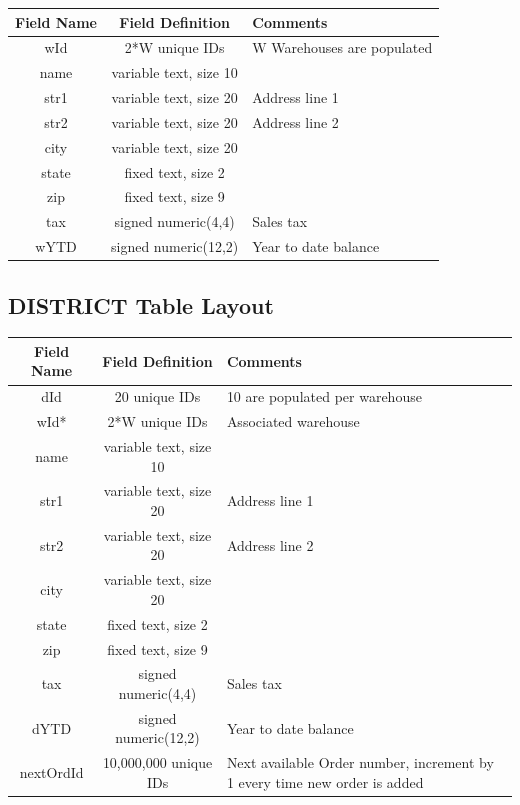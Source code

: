 \begin{center}
\begin{tabular}{ |c|c|m{7.5cm}| } 
 \hline
 Field Name & Field Definition & Comments \\ 
 \hline
 \rowcolor{gray}
 wId & 2*W unique IDs & W Warehouses are populated \\ 
 name & variable text, size 10 &  \\ 
 str1 & variable text, size 20 & Address line 1 \\
 str2 & variable text, size 20 & Address line 2 \\
 city & variable text, size 20 &  \\
 state & fixed text, size 2 & \\
 zip & fixed text, size 9 &  \\
 tax & signed numeric(4,4) & Sales tax \\
 wYTD & signed numeric(12,2) & Year to date balance \\

 \hline
\end{tabular}
\end{center}

\subsection{DISTRICT Table Layout}

\begin{center}
\begin{tabular}{ |c|c|m{7.5cm}| } 
 \hline
 Field Name & Field Definition & Comments \\ 
 \hline
 \rowcolor{gray}
 dId & 20 unique IDs & 10 are populated per warehouse\\
\rowcolor{gray}
 wId* & 2*W unique IDs & Associated warehouse \\ 
 name & variable text, size 10 &  \\ 
 str1 & variable text, size 20 & Address line 1 \\
 str2 & variable text, size 20 & Address line 2 \\
 city & variable text, size 20 &  \\
 state & fixed text, size 2 & \\
 zip & fixed text, size 9 &  \\
 tax & signed numeric(4,4) & Sales tax \\
 dYTD & signed numeric(12,2) & Year to date balance \\
 nextOrdId & 10,000,000 unique IDs & Next available Order number, increment by 1 every time new order is added \\
 \hline
\end{tabular}
\end{center}

